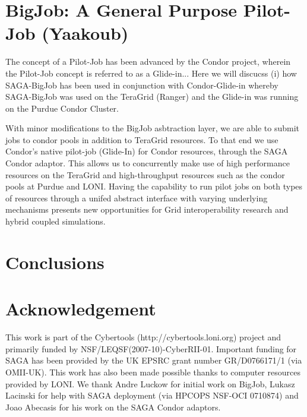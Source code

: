 \documentclass[conference,final]{IEEEtran}
\begin{document}
\section{BigJob: A General Purpose Pilot-Job (Yaakoub)}

The concept of a Pilot-Job has been advanced by the Condor project, wherein the Pilot-Job concept is referred to as a Glide-in...  Here we will discucss (i) how SAGA-BigJob has been used in conjunction with Condor-Glide-in whereby SAGA-BigJob was used on the TeraGrid (Ranger) and the Glide-in was running on the Purdue Condor Cluster.

With minor modifications to the BigJob asbtraction layer, we are able to submit jobs to condor pools in addition to TeraGrid resources. To that end we use Condor's native pilot-job (Glide-In) for Condor resources, through the SAGA Condor adaptor. This allows us to concurrently make use of high performance resources on the TeraGrid and high-throughput resources such as the condor pools at Purdue and LONI. Having the capability to run pilot jobs on both types of resources through a unifed abstract interface with varying underlying mechanisms presents new opportunities for Grid interoperability research and hybrid coupled simulations.



\section{Conclusions}


\section*{Acknowledgement}
This work is part of the Cybertools (http://cybertools.loni.org) project and primarily funded by NSF/LEQSF(2007-10)-CyberRII-01. Important funding for SAGA has been provided by the UK EPSRC grant number GR/D0766171/1 (via OMII-UK).  This work has also been made possible thanks to computer resources provided by LONI.  We thank Andre Luckow for initial work on BigJob, Lukasz Lacinski for help with SAGA deployment (via HPCOPS NSF-OCI 0710874) and Joao Abecasis for his work on the SAGA Condor adaptors.

\nocite{ex1,ex2}
%


\end{document}
